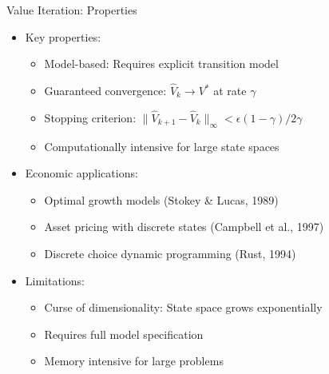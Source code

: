 \documentclass[10pt]{beamer}
\begin{document}
\begin{frame}{Value Iteration: Properties}
    \begin{itemize}
        \item Key properties:
        \begin{itemize}
            \item Model-based: Requires explicit transition model
            \item Guaranteed convergence: $\hat{V}_k \to V^*$ at rate $\gamma$
            \item Stopping criterion: $\|\hat{V}_{k+1} - \hat{V}_k\|_{\infty} < \epsilon(1-\gamma)/2\gamma$
            \item Computationally intensive for large state spaces
        \end{itemize}
        \vspace{0.2cm}
        \item Economic applications:
        \begin{itemize}
            \item Optimal growth models (Stokey \& Lucas, 1989)
            \item Asset pricing with discrete states (Campbell et al., 1997)
            \item Discrete choice dynamic programming (Rust, 1994)
        \end{itemize}
        \vspace{0.2cm}
        \item Limitations:
        \begin{itemize}
            \item Curse of dimensionality: State space grows exponentially
            \item Requires full model specification
            \item Memory intensive for large problems
        \end{itemize}
    \end{itemize}
\end{frame}

\end{document}
